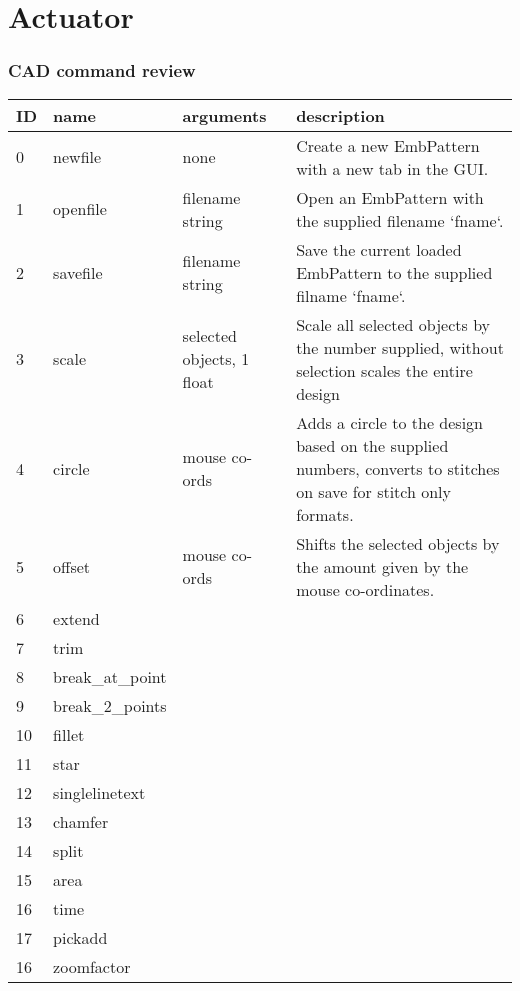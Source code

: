 \chapter{Actuator}


\subsection{CAD command review}

\begin{longtable}{l l l p{8cm}}
\textbf{ID} & \textbf{name} & \textbf{arguments} & \textbf{description} \\
\hline
0 & \index{newfile}newfile & none & Create a new EmbPattern with a new tab in the GUI. \\
1 & \index{openfile}openfile & filename string & Open an EmbPattern with the supplied filename `fname`.  \\
2 & \index{savefile}savefile & filename string & Save the current loaded EmbPattern to the supplied filname `fname`. \\
3 & \index{scale}scale & selected objects, 1 float & Scale all selected objects by the number supplied, without selection scales the entire design \\
4 & \index{circle}circle & mouse co-ords & Adds a circle to the design based on the supplied numbers, converts to stitches on save for stitch only formats. \\
5 & \index{offset}offset & mouse co-ords & Shifts the selected objects by the amount given by the mouse co-ordinates.  \\
6 & \index{extend}extend & & \\
7 & \index{trim}trim & & \\
8 & \index{break-at-point}break\_at\_point & & \\
9 & \index{break-2-points}break\_2\_points & & \\
10 & \index{fillet}fillet & & \\
11 & \index{star}star & & \\
12 & \index{singlelinetext}singlelinetext & & \\
13 & \index{chamfer}chamfer & & \\
14 & \index{split}split & & \\
15 & \index{area}area & & \\
16 & \index{time}time & & \\
17 & \index{pickadd}pickadd & & \\
16 & \index{zoomfactor}zoomfactor & & \\

\end{longtable}
